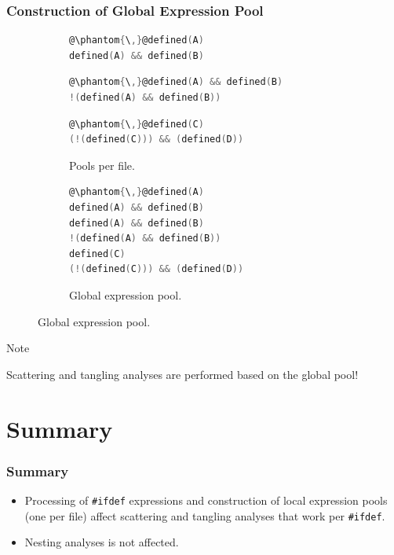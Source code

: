\documentclass{beamer}
\newcommand\code[1]{\texttt{#1}}
\newcommand\ifdeff[1]{\code{\##1}\xspace}
\newcommand\ifdef[0]{{\upshape\ifdeff{ifdef}}\xspace}
\begin{document}
\begin{frame}[fragile]
\frametitle{Construction of Global Expression Pool}

\begin{figure}

	\begin{subfigure}[c]{0.45\textwidth}

		\begin{lstlisting}[language=C]
@\phantom{\,}@defined(A)
defined(A) && defined(B)
		\end{lstlisting}

		\begin{lstlisting}[language=C]
@\phantom{\,}@defined(A) && defined(B)
!(defined(A) && defined(B))
		\end{lstlisting}		
	
		\begin{lstlisting}[language=C]
@\phantom{\,}@defined(C)
(!(defined(C))) && (defined(D))
		\end{lstlisting}
	
	\caption{\scriptsize Pools per file.}
	\end{subfigure}
	\hfill
	\begin{subfigure}[c]{0.45\textwidth}

		\begin{lstlisting}[language=C]
@\phantom{\,}@defined(A)
defined(A) && defined(B)
defined(A) && defined(B)
!(defined(A) && defined(B))
defined(C)
(!(defined(C))) && (defined(D))
		\end{lstlisting}
	
	\caption{\scriptsize Global expression pool.}
	\end{subfigure}


\end{figure}

\begin{block}{Note}

Scattering and tangling analyses are performed based on the global pool!

\end{block}

\end{frame}


\section{Summary}

\begin{frame}
\frametitle{Summary}

\begin{itemize}

\item Processing of \ifdef expressions and construction of local expression pools (one per file) affect scattering and tangling analyses that work per \ifdef.
\item Nesting analyses is not affected.

\end{itemize}

\end{frame}
  
\end{document}
